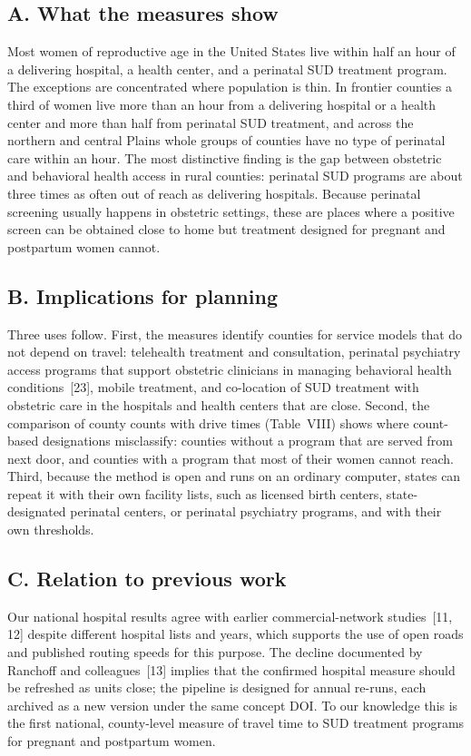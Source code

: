 \documentclass{article}
\begin{document}
\subsection*{A. What the measures show}
Most women of reproductive age in the United States live within half an hour of a delivering hospital, a health center, and a perinatal SUD treatment program. The exceptions are concentrated where population is thin. In frontier counties a third of women live more than an hour from a delivering hospital or a health center and more than half from perinatal SUD treatment, and across the northern and central Plains whole groups of counties have no type of perinatal care within an hour. The most distinctive finding is the gap between obstetric and behavioral health access in rural counties: perinatal SUD programs are about three times as often out of reach as delivering hospitals. Because perinatal screening usually happens in obstetric settings, these are places where a positive screen can be obtained close to home but treatment designed for pregnant and postpartum women cannot.

\subsection*{B. Implications for planning}
Three uses follow. First, the measures identify counties for service models that do not depend on travel: telehealth treatment and consultation, perinatal psychiatry access programs that support obstetric clinicians in managing behavioral health conditions~[23], mobile treatment, and co-location of SUD treatment with obstetric care in the hospitals and health centers that are close. Second, the comparison of county counts with drive times (Table~VIII) shows where count-based designations misclassify: counties without a program that are served from next door, and counties with a program that most of their women cannot reach. Third, because the method is open and runs on an ordinary computer, states can repeat it with their own facility lists, such as licensed birth centers, state-designated perinatal centers, or perinatal psychiatry programs, and with their own thresholds.

\subsection*{C. Relation to previous work}
Our national hospital results agree with earlier commercial-network studies~[11, 12] despite different hospital lists and years, which supports the use of open roads and published routing speeds for this purpose. The decline documented by Ranchoff and colleagues~[13] implies that the confirmed hospital measure should be refreshed as units close; the pipeline is designed for annual re-runs, each archived as a new version under the same concept DOI. To our knowledge this is the first national, county-level measure of travel time to SUD treatment programs for pregnant and postpartum women.
\end{document}
